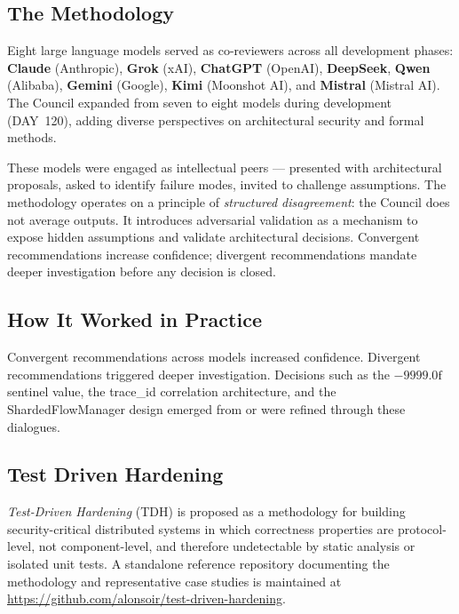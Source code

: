 \documentclass[11pt,a4paper]{article}
\begin{document}
    \subsection{The Methodology}

    Eight large language models served as co-reviewers across all development phases:
    \textbf{Claude} (Anthropic), \textbf{Grok} (xAI), \textbf{ChatGPT} (OpenAI),
    \textbf{DeepSeek}, \textbf{Qwen} (Alibaba), \textbf{Gemini} (Google),
    \textbf{Kimi} (Moonshot AI), and \textbf{Mistral} (Mistral AI).
    The Council expanded from seven to eight models during development (DAY~120),
    adding diverse perspectives on architectural security and formal methods.

    These models were engaged as intellectual peers --- presented with architectural proposals,
    asked to identify failure modes, invited to challenge assumptions. The methodology operates
    on a principle of \emph{structured disagreement}: the Council does not average outputs.
    It introduces adversarial validation as a mechanism to expose hidden assumptions and
    validate architectural decisions. Convergent recommendations increase confidence; divergent
    recommendations mandate deeper investigation before any decision is closed.

    \subsection{How It Worked in Practice}

    Convergent recommendations across models increased confidence. Divergent recommendations
    triggered deeper investigation. Decisions such as the $-9999.0\text{f}$ sentinel value, the
    trace\_id correlation architecture, and the ShardedFlowManager design emerged from or were
    refined through these dialogues.

    \subsection{Test Driven Hardening}
    \label{subsec:tdh}

    \emph{Test-Driven Hardening} (TDH) is proposed as a methodology for building
    security-critical distributed systems in which correctness properties are protocol-level,
    not component-level, and therefore undetectable by static analysis or isolated unit tests.
    A standalone reference repository documenting the methodology and representative case studies
    is maintained at \url{https://github.com/alonsoir/test-driven-hardening}.
\end{document}
